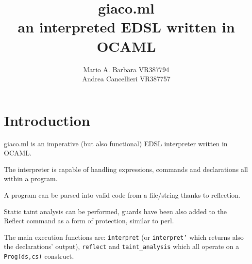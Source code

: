 \documentclass[11pt]{article}
\author{Mario A. Barbara VR387794 \\ Andrea Cancellieri VR387757}
\date{}
\title{giaco.ml\\\medskip
\large an interpreted EDSL written in OCAML}
\begin{document}
\maketitle
\section{Introduction}
\label{sec:orga8b6030}
giaco.ml is an imperative (but also functional) EDSL interpreter written in OCAML.

The interpreter is capable of handling expressions, commands and declarations all within a program.

A program can be parsed into valid code from a file/string thanks to reflection.

Static taint analysis can be performed, guards have been also
added to the Reflect command as a form of protection, similar to perl.

The main execution functions are: \texttt{interpret} (or \texttt{interpret'} which returns also the declarations' output), \texttt{reflect} and \texttt{taint\_analysis} which all operate on a \texttt{Prog(ds,cs)} construct.
\end{document}
